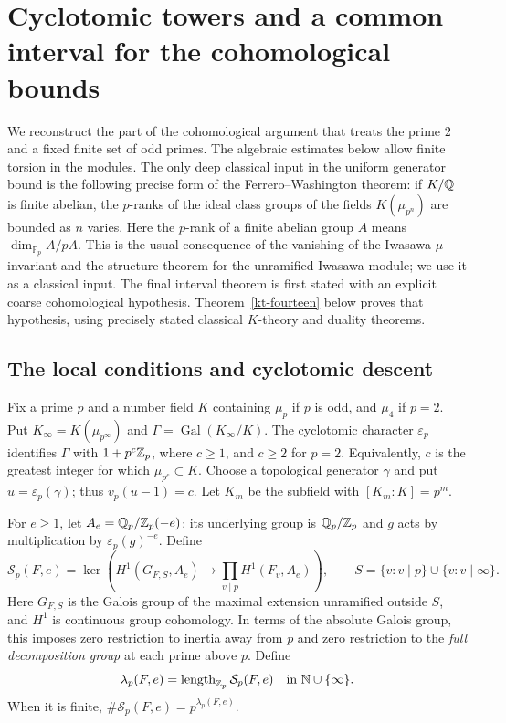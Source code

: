\section{Cyclotomic towers and a common interval for the cohomological bounds}
\label{sec:ct-intervals}

We reconstruct the part of the cohomological argument\cite{alpo-uniform-source} that treats the
prime $2$ and a fixed finite set of odd primes. The algebraic estimates
below allow finite torsion in the modules. The only deep classical
input in the uniform generator bound is the following precise form of
the Ferrero--Washington theorem: if $K/\mathbb Q$ is finite abelian, the
$p$-ranks of the ideal class groups of the fields
$K(\mu_{p^n})$ are bounded as $n$ varies. Here the $p$-rank of a finite
abelian group $A$ means $\dim_{\mathbb F_p} A/pA$.
This is the usual consequence of the vanishing of the Iwasawa
$\mu$-invariant and the structure theorem for the unramified Iwasawa
module; we use it as a classical input\cite{ct-fw,ct-sharifi}.
The final interval theorem is first stated with an explicit coarse
cohomological hypothesis. Theorem~\ref{kt-fourteen} below proves
that hypothesis, using precisely stated classical $K$-theory and
duality theorems.

\subsection{The local conditions and cyclotomic descent}

Fix a prime $p$ and a number field $K$ containing $\mu_p$ if $p$ is
odd, and $\mu_4$ if $p=2$. Put
$K_\infty=K(\mu_{p^\infty})$ and
$\Gamma=\operatorname{Gal}(K_\infty/K)$. The cyclotomic character
$\varepsilon_p$ identifies $\Gamma$ with $1+p^c\mathbb Z_p$, where
$c\ge1$, and $c\ge2$ for $p=2$. Equivalently, $c$ is the greatest
integer for which $\mu_{p^c}\subset K$. Choose a topological generator
$\gamma$ and put $u=\varepsilon_p(\gamma)$; thus
$v_p(u-1)=c$. Let $K_m$ be the subfield with
$[K_m:K]=p^m$.

For $e\ge1$, let $A_e=\mathbb Q_p/\mathbb Z_p(-e)$: its underlying group is
$\mathbb Q_p/\mathbb Z_p$ and $g$ acts by multiplication by
$\varepsilon_p(g)^{-e}$. Define
\[
 \mathcal S_p(F,e)=
 \ker\left(H^1(G_{F,S},A_e)\longrightarrow
                  \prod_{v\mid p}H^1(F_v,A_e)\right),
 \qquad S=\{v:v\mid p\}\cup\{v:v\mid\infty\}.
\]
Here $G_{F,S}$ is the Galois group of the maximal extension unramified
outside $S$, and $H^1$ is continuous group cohomology. In terms of the
absolute Galois group, this imposes zero restriction to inertia away
from $p$ and zero restriction to the \emph{full decomposition group}
at each prime above $p$. Define
\[
 \lambda_p(F,e)=\operatorname{length}_{\mathbb Z_p}\mathcal S_p(F,e)
       \quad\hbox{in }\mathbb N\cup\{\infty\}.
\]
When it is finite, $\#\mathcal S_p(F,e)=p^{\lambda_p(F,e)}$.


